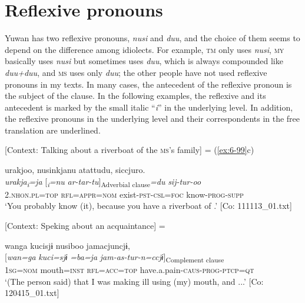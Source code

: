 \section{Reflexive pronouns}

Yuwan has two reflexive pronouns, \textit{nusi} and \textit{duu}, and the choice of them seems to depend on the difference among idiolects. For example, \textsc{tm} only uses \textit{nusi}, \textsc{my} basically uses \textit{nusi} but sometimes uses \textit{duu}, which is always compounded like \textit{duu+duu}, and \textsc{ms} uses only \textit{duu}; the other people have not used reflexive pronouns in my texts. In many cases, the antecedent of the reflexive pronoun is the subject of the clause. In the following examples, the reflexive and its antecedent is marked by the small italic “\textit{i}” in the underlying level. In addition, the reflexive pronouns in the underlying level and their correspondents in the free translation are underlined.

\ea \label{ex:7:7}  
\ea\label{ex:7:7a}  [Context: Talking about a riverboat of the \textsc{ms}’s family] = (\ref{ex:6-99}c)

  {\TM}
\glll urakjoo,  nusinkjanu  atattudu,   siccjuro.\\
\textit{urakja\textsubscript{i}}\textit{=ja}  [\textit{\textsubscript{i}}\textit{=nu}  \textit{ar-tar-tu}]\textsubscript{Adverbial clause}\textit{=du}  \textit{sij-tur-oo}\\
      2.\textsc{nhon}.\textsc{pl}=\textsc{top}  \textsc{rfl}=\textsc{appr}=\textsc{nom}  exist-\textsc{pst}-\textsc{csl}=\textsc{foc}   know-\textsc{prog}-\textsc{supp}\\
\glt    ‘You probably know (it), because you have a riverboat of .’      [Co: 111113\_01.txt]

\ex\label{ex:7:7b}  [Context: Speking about an acquaintance] = 

{\TM}
\glll  wanga  kucisjɨ  nusiboo  jamacjuncjɨ,\\
{}[\textit{wan=ga}  \textit{kuci=sjɨ}  \textit{=ba=ja}  \textit{jam-as-tur-n=ccjɨ}]\textsubscript{Complement clause}\\
1\textsc{sg}=\textsc{nom}  mouth=\textsc{inst}  \textsc{rfl}=\textsc{acc}=\textsc{top}  have.a.pain-\textsc{caus}-\textsc{prog}-\textsc{ptcp}=\textsc{qt}\\
\glt ‘(The person said) that I was making \textit{\textsubscript{} }ill using (my) mouth, and ...’ [Co: 120415\_01.txt]

